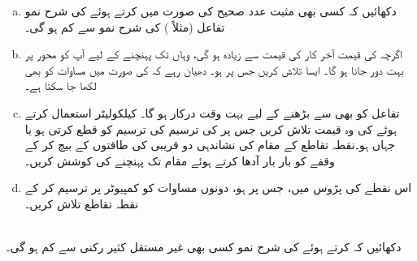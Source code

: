 \begin{enumerate}[a.]
\item
دکھائیں کہ کسی بھی مثبت عدد صحیح  کی صورت میں  کرتے ہوئے  کی شرح نمو تفاعل  (مثلاً ) کی شرح نمو سے کم ہو گی۔
\item
اگرچہ  کی قیمت آخر کار  کی قیمت سے زیادہ ہو گی، وہاں تک پہنچنے کے لیے آپ کو محور  پر بہت دور جانا ہو گا۔ ایسا  تلاش کریں جس پر  ہو۔ دھیان رہے کہ  کی صورت میں مساوات  کو  بھی لکھا جا سکتا ہے۔
\item
تفاعل  کو بھی  سے بڑھنے  کے لیے  بہت وقت درکار ہو گا۔ کیلکولیٹر استعمال کرتے ہوئے  کی وہ قیمت تلاش کریں جس پر  کی ترسیم  کی ترسیم کو قطع  کرتی ہو یا جہاں  ہو۔نقطہ تقاطع  کے مقام کی نشاندہی   دو قریبی   کی طاقتوں کے بیچ    کر کے   وقفے کو  بار بار آدھا کرتے ہوئے   مقام تک پہنچنے کی کوشش کریں۔
\item
اس  نقطے   کی پڑوس میں، جس پر  ہو،  دونوں  مساوات  کو کمپیوٹر پر ترسیم کر کے  نقطہ تقاطع  تلاش کریں۔
\end{enumerate}
\\
دکھائیں کہ  کرتے ہوئے  کی شرح نمو کسی بھی غیر مستقل کثیر رکنی سے کم ہو گی۔
\\

